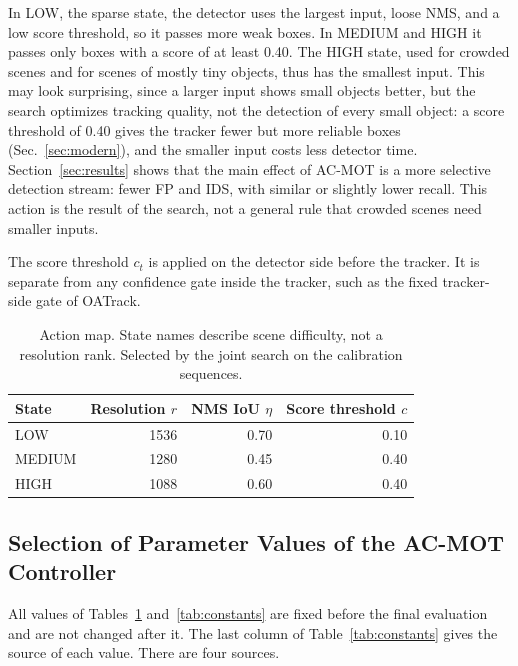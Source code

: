 \documentclass[journal]{new-aiaa}
\begin{document}
In LOW, the sparse state, the detector uses the largest input, loose NMS, and
a low score threshold, so it passes more weak boxes. In MEDIUM and HIGH it passes only
boxes with a score of at least 0.40. The HIGH state, used for crowded scenes
and for scenes of mostly tiny objects, thus has the smallest input. This may
look surprising, since a larger input shows small objects better, but the
search optimizes tracking quality, not the detection of every small object: a
score threshold of 0.40 gives the tracker fewer but more reliable boxes
(Sec.~\ref{sec:modern}), and the smaller input costs less detector time.
Section~\ref{sec:results} shows that the main effect of AC-MOT is a more
selective detection stream: fewer FP and IDS, with similar or slightly lower
recall. This action is the result of the search, not a general rule that
crowded scenes need smaller inputs.

The score threshold $c_t$ is applied on the detector side before the tracker.
It is separate from any confidence gate inside the tracker, such as the fixed
tracker-side gate of OATrack.

\begin{table}[htbp]
\caption{Action map. State names describe scene difficulty, not a resolution
rank. Selected by the joint search on the calibration sequences.}
\label{tab:actions}
\centering\footnotesize
\begin{tabular}{@{}lrrr@{}}
\toprule
State & Resolution $r$ & NMS IoU $\eta$ & Score threshold $c$\\
\midrule
LOW & 1536 & 0.70 & 0.10\\
MEDIUM & 1280 & 0.45 & 0.40\\
HIGH & 1088 & 0.60 & 0.40\\
\bottomrule
\end{tabular}
\end{table}

\subsection{Selection of Parameter Values of the AC-MOT Controller}\label{sec:constants}
All values of Tables~\ref{tab:actions} and~\ref{tab:constants} are fixed
before the final evaluation and are not changed after it. The last column of
Table~\ref{tab:constants} gives the source of each value. There are four
sources.
\end{document}
